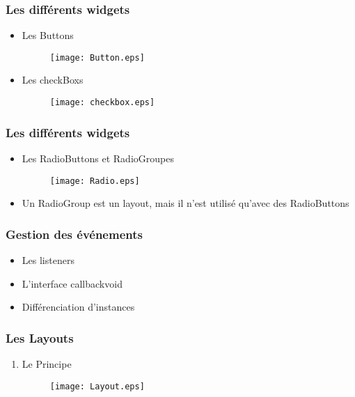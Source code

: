 \documentclass{beamer}
\begin{document}
\begin{frame}
  \frametitle{Les différents widgets}
  \begin{itemize}
  \item Les Buttons 
        \begin{figure}
            \centering
                \texttt{[image: Button.eps]}
        \end{figure}
        \pause
   \item Les checkBoxs     
        \begin{figure}
            \centering
                \texttt{[image: checkbox.eps]}
        \end{figure}
  \end{itemize}
\end{frame}



\begin{frame}
  \frametitle{Les différents widgets}
  \begin{itemize}
    \item Les RadioButtons et RadioGroupes
        \begin{figure}
            \centering
                \texttt{[image: Radio.eps]}
        \end{figure}
    \item Un RadioGroup est un layout, mais il n'est utilisé qu'avec des RadioButtons
  \end{itemize}
\end{frame}

\begin{frame}
  \frametitle{Gestion des événements}
    \begin{itemize}
         \item Les listeners
         \item L'interface callbackvoid
         \item Différenciation d'instances
  \end{itemize}
\end{frame}



\begin{frame}
  \frametitle{Les Layouts}
   \begin{enumerate}[1]
        \item Le Principe
        \begin{figure}
            \centering
                \texttt{[image: Layout.eps]}
        \end{figure}
   \end{enumerate}
\end{frame}
\end{document}

